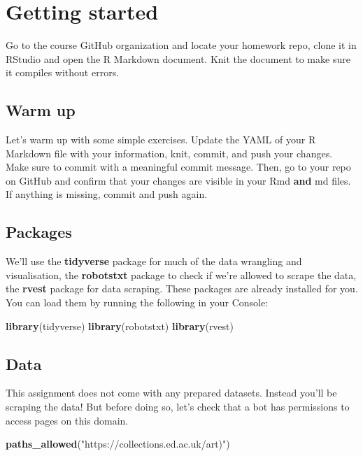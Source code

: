 \documentclass[
]{article}
\newenvironment{Shaded}{\begin{snugshade}}{\end{snugshade}}
\newcommand{\FunctionTok}[1]{\textcolor[rgb]{0.13,0.29,0.53}{\textbf{#1}}}
\newcommand{\NormalTok}[1]{#1}
\newcommand{\StringTok}[1]{\textcolor[rgb]{0.31,0.60,0.02}{#1}}
\begin{document}
\section{Getting started}\label{getting-started}

Go to the course GitHub organization and locate your homework repo,
clone it in RStudio and open the R Markdown document. Knit the document
to make sure it compiles without errors.

\subsection{Warm up}\label{warm-up}

Let's warm up with some simple exercises. Update the YAML of your R
Markdown file with your information, knit, commit, and push your
changes. Make sure to commit with a meaningful commit message. Then, go
to your repo on GitHub and confirm that your changes are visible in your
Rmd \textbf{and} md files. If anything is missing, commit and push
again.

\subsection{Packages}\label{packages}

We'll use the \textbf{tidyverse} package for much of the data wrangling
and visualisation, the \textbf{robotstxt} package to check if we're
allowed to scrape the data, the \textbf{rvest} package for data
scraping. These packages are already installed for you. You can load
them by running the following in your Console:

\begin{Shaded}
\begin{Highlighting}[]
\FunctionTok{library}\NormalTok{(tidyverse)}
\FunctionTok{library}\NormalTok{(robotstxt)}
\FunctionTok{library}\NormalTok{(rvest)}
\end{Highlighting}
\end{Shaded}

\subsection{Data}\label{data}

This assignment does not come with any prepared datasets. Instead you'll
be scraping the data! But before doing so, let's check that a bot has
permissions to access pages on this domain.

\begin{Shaded}
\begin{Highlighting}[]
\FunctionTok{paths\_allowed}\NormalTok{(}\StringTok{"https://collections.ed.ac.uk/art)"}\NormalTok{)}
\end{Highlighting}
\end{Shaded}
\end{document}
